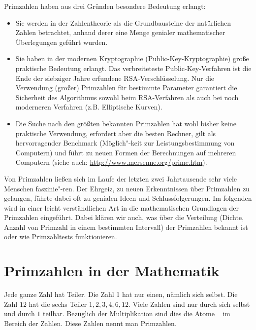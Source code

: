 \begin{refsegment}
 Primzahlen haben aus drei Gründen besondere Bedeutung erlangt:
\begin{itemize}
  \item Sie werden in der Zahlentheorie als die Grundbausteine der
        natürlichen Zahlen betrachtet, anhand derer eine Menge genialer
        mathematischer Überlegungen geführt wurden.
  \item Sie haben in der modernen  Kryptographie
        (Public-Key-Kryptographie) große
        praktische Bedeutung erlangt. Das verbreiteteste Public-Key-Verfahren
        ist die Ende der siebziger Jahre erfundene 
        RSA-Verschlüsselung. Nur die Verwendung (großer) Primzahlen für
        bestimmte Parameter garantiert die Sicherheit des Algorithmus sowohl
        beim RSA-Verfahren als auch bei noch moderneren Verfahren
        (z.B. Elliptische Kurven).
  \item Die Suche nach den größten bekannten Primzahlen hat wohl bisher
        keine praktische Verwendung, erfordert aber die besten Rechner, gilt
        als hervorragender Benchmark (Möglich"-keit zur Leistungsbestimmung von
        Computern) und führt zu neuen Formen der Berechnungen auf mehreren
        Computern (siehe auch: \url{http://www.mersenne.org/prime.htm}).
\end{itemize}
Von Primzahlen ließen sich im Laufe der letzten zwei Jahrtausende sehr viele
Menschen faszinie"-ren.
Der Ehrgeiz, zu neuen Erkenntnissen über Primzahlen zu gelangen, führte
dabei oft zu genialen Ideen und Schlussfolgerungen.
Im folgenden wird in einer leicht verständlichen Art in die mathematischen
Grundlagen der Primzahlen eingeführt. Dabei klären wir auch, was über die
Verteilung (Dichte, Anzahl von Primzahl in einem bestimmten Intervall) der
Primzahlen bekannt ist oder wie Primzahltests funktionieren.


\section{Primzahlen in der Mathematik}\label{primesinmath}

Jede ganze Zahl hat Teiler. Die Zahl 1 hat nur einen, nämlich
sich selbst. Die Zahl $12$ hat die sechs Teiler $1, 2, 3, 4, 6,
12$. Viele Zahlen sind nur durch sich selbst und durch $1$ teilbar.
Bezüglich der Multiplikation sind dies die \glqq Atome\grqq
~ im Bereich der Zahlen. Diese Zahlen nennt man Primzahlen.


\end{refsegment}
